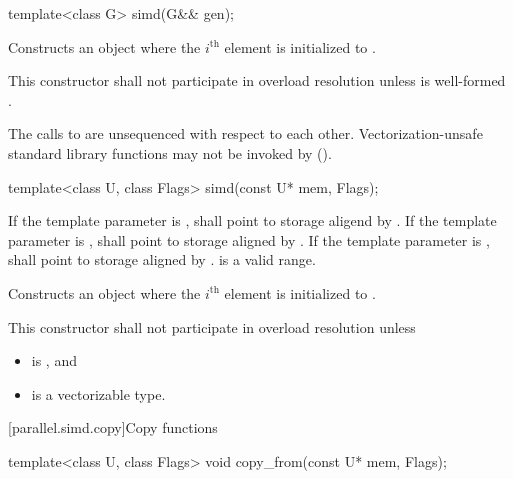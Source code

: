 \begin{itemdecl}
template<class G> simd(G&& gen);
\end{itemdecl}

\begin{itemdescr}
  \pnum\effects
  Constructs an object where the $i^\text{th}$ element is initialized to .

  \pnum\remarks
  This constructor shall not participate in overload resolution unless  is well-formed \foralli.

  \pnum
  The calls to  are unsequenced with respect to each other. Vectorization-unsafe standard library functions may not be invoked by  ().
\end{itemdescr}

\begin{itemdecl}
template<class U, class Flags> simd(const U* mem, Flags);
\end{itemdecl}

\begin{itemdescr}
  \pnum\requires
  If the template parameter  is ,  shall point to storage aligend by . If the template parameter  is ,  shall point to storage aligned by . If the template parameter  is ,  shall point to storage aligned by . \tcode{[mem, mem + size())} is a valid range.

  \pnum\effects
  Constructs an object where the $i^\text{th}$ element is initialized to  \foralli.

  \pnum\remarks
  This constructor shall not participate in overload resolution unless
  \begin{itemize}
    \item {} is , and
    \item {} is a vectorizable type.
  \end{itemize}
\end{itemdescr}

[parallel.simd.copy]{Copy functions}

\begin{itemdecl}
template<class U, class Flags> void copy_from(const U* mem, Flags);
\end{itemdecl}

